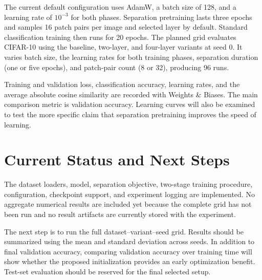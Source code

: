 \documentclass[11pt]{article}
\begin{document}
The current default configuration uses AdamW, a batch size of 128, and a
learning rate of $10^{-3}$ for both phases. Separation pretraining lasts three
epochs and samples 16 patch pairs per image and selected layer by default.
Standard classification training then runs for 20 epochs. The planned grid
evaluates CIFAR-10 using the baseline, two-layer, and four-layer variants at
seed 0. It varies batch size, the learning rates for both training phases,
separation duration (one or five epochs), and patch-pair count (8 or 32),
producing 96 runs.

Training and validation loss, classification accuracy, learning rates, and the
average absolute cosine similarity are recorded with Weights \& Biases.  The
main comparison metric is validation accuracy.  Learning curves will also be
examined to test the more specific claim that separation pretraining improves
the speed of learning.

\section{Current Status and Next Steps}

The dataset loaders, model, separation objective, two-stage training procedure,
configuration, checkpoint support, and experiment logging are implemented.
No aggregate numerical results are included yet because the complete grid has
not been run and no result artifacts are currently stored with the experiment.

The next step is to run the full dataset--variant--seed grid.  Results should be
summarized using the mean and standard deviation across seeds.  In addition to
final validation accuracy, comparing validation accuracy over training time
will show whether the proposed initialization provides an early optimization
benefit.  Test-set evaluation should be reserved for the final selected setup.
\end{document}

